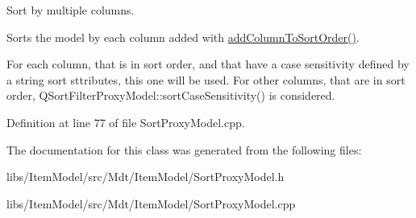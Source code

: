 Sort by multiple columns. 

Sorts the model by each column added with \hyperlink{class_mdt_1_1_item_model_1_1_sort_proxy_model_a5a3f0c33b558ff9ce75c827e7b699663}{add\+Column\+To\+Sort\+Order()}.

For each column, that is in sort order, and that have a case sensitivity defined by a string sort sttributes, this one will be used. For other columns, that are in sort order, Q\+Sort\+Filter\+Proxy\+Model\+::sort\+Case\+Sensitivity() is considered. 

Definition at line 77 of file Sort\+Proxy\+Model.\+cpp.



The documentation for this class was generated from the following files\+:\begin{DoxyCompactItemize}
\item 
libs/\+Item\+Model/src/\+Mdt/\+Item\+Model/Sort\+Proxy\+Model.\+h\item 
libs/\+Item\+Model/src/\+Mdt/\+Item\+Model/Sort\+Proxy\+Model.\+cpp\end{DoxyCompactItemize}
